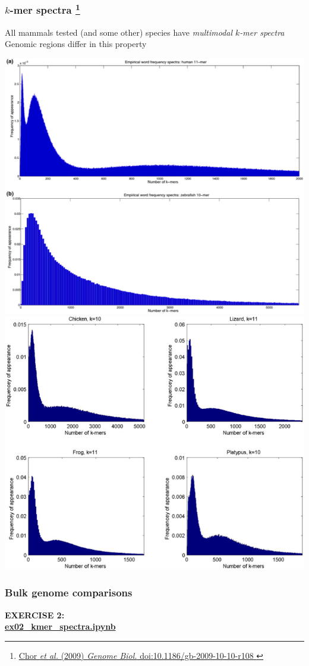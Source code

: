 %
\begin{frame}
  \frametitle{$k$-mer spectra
  \footnote{\tiny{\href{http://dx.doi.org/10.1186/gb-2009-10-10-r108
}{Chor \textit{et al.} (2009) \textit{Genome Biol.} doi:10.1186/gb-2009-10-10-r108
}}}
  }
  \textcolor{RawSienna}{All mammals tested (and some other) species have \textit{multimodal $k$-mer spectra}} \\
  Genomic regions differ in this property
  \begin{center}
    \includegraphics[height=0.4\textheight]{images/kmer_mammal1}
    \includegraphics[height=0.4\textheight]{images/kmer_mammal2}    
  \end{center}  
\end{frame}

%
\begin{frame}
  \frametitle{Bulk genome comparisons}
  \Large{
    \textcolor{hutton_blue}{
      \textbf{
      EXERCISE 2: \\
      \url{ex02_kmer_spectra.ipynb}
      }
    }
  }
\end{frame}